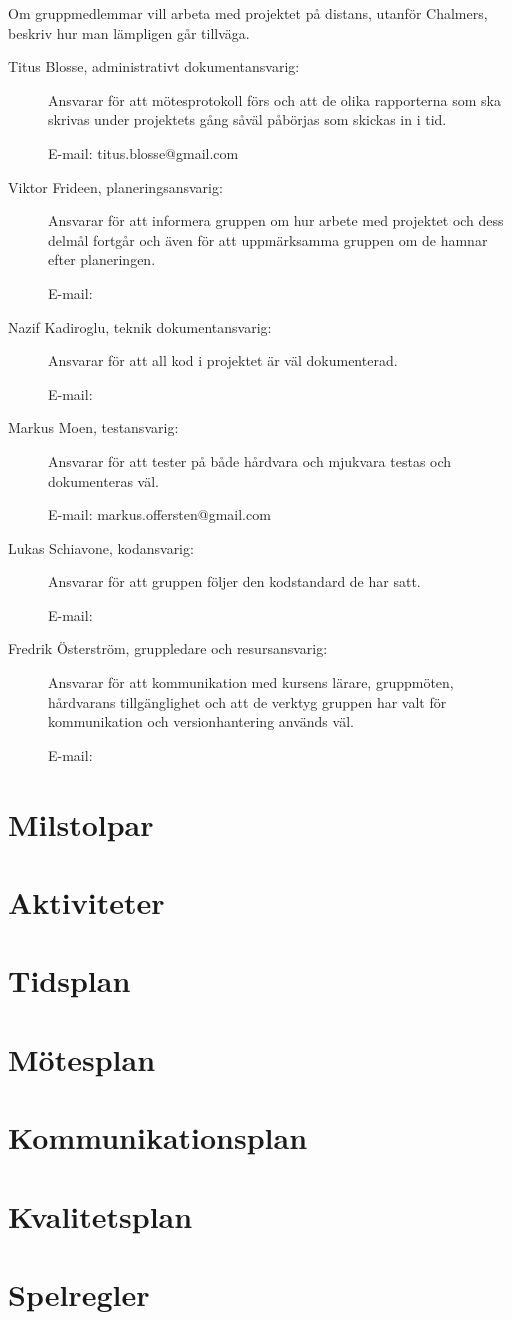 \documentclass{article}
\begin{document}
Om gruppmedlemmar vill arbeta med projektet på distans, utanför
Chalmers, beskriv hur man lämpligen går tillväga.

\begin{description}
    \item[Titus Blosse, administrativt dokumentansvarig:] Ansvarar för att mötesprotokoll förs och att de olika rapporterna som ska skrivas under projektets gång såväl påbörjas som skickas in i tid.
    
    E-mail: titus.blosse@gmail.com
    
    \item[Viktor Frideen, planeringsansvarig:] Ansvarar för att informera gruppen om hur arbete med projektet och dess delmål fortgår och även för att uppmärksamma gruppen om de hamnar efter planeringen.
    
    E-mail: 
    
    \item[Nazif Kadiroglu, teknik dokumentansvarig:] Ansvarar för att all kod i projektet är väl dokumenterad.
    
    E-mail: 
    
    \item[Markus Moen, testansvarig:] Ansvarar för att tester på både hårdvara och mjukvara testas och dokumenteras väl.
    
    E-mail: markus.offersten@gmail.com
    
    \item[Lukas Schiavone, kodansvarig:] Ansvarar för att gruppen följer den kodstandard de har satt.
    
    E-mail: 
    
    \item[Fredrik Österström, gruppledare och resursansvarig:] Ansvarar för att kommunikation med kursens lärare, gruppmöten, hårdvarans tillgänglighet och att de verktyg gruppen har valt för kommunikation och versionhantering används väl.
    
    E-mail: 
\end{description}

\section{Milstolpar}

\section{Aktiviteter}

\section{Tidsplan}

\section{Mötesplan}

\section{Kommunikationsplan}

\section{Kvalitetsplan}

\section{Spelregler}
\end{document}
